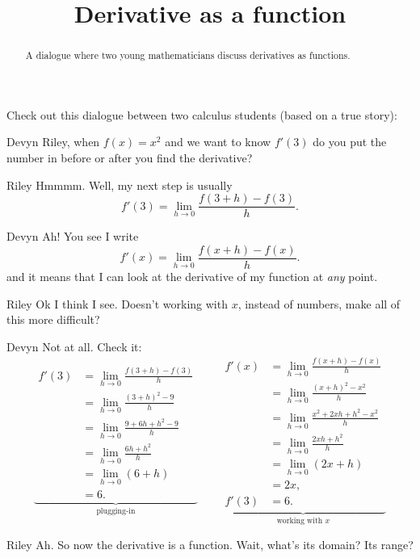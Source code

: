 \documentclass{ximera}
\title[Break-Ground:]{Derivative as a function}
\begin{document}
\begin{abstract}
A dialogue where two young mathematicians discuss derivatives as
functions.
\end{abstract}
\maketitle

Check out this dialogue between two calculus students (based on a true
story):

\begin{dialogue}
\item[Devyn] Riley, when $f(x) = x^2$ and we want to know $f'(3)$ do
  you put the number in before or after you find the derivative?
\item[Riley] Hmmmm. Well, my next step is usually
  \[
  f'(3) = \lim_{h\to 0}\frac{f(3+h)-f(3)}{h}.
  \]
\item[Devyn] Ah! You see I write
  \[
  f'(x) = \lim_{h\to 0}\frac{f(x+h)-f(x)}{h}.
  \]
  and it means that I can look at the derivative of my function at
  \textit{any} point.
\item[Riley] Ok I think I see. Doesn't working with $x$, instead of
  numbers, make all of this more difficult?
\item[Devyn] Not at all. Check it:
  \[
 \underbrace{\begin{aligned}
    f'(3) &= \lim_{h\to 0}\frac{f(3+h)-f(3)}{h}\\
    &= \lim_{h\to 0}\frac{(3+h)^2-9}{h}\\
    &= \lim_{h\to 0}\frac{9+6h+h^2-9}{h}\\
    &= \lim_{h\to 0}\frac{6h+h^2}{h}\\
    &= \lim_{h\to 0}(6+h)\\
    &= 6.
  \end{aligned}}_{\text{plugging-in}}
  \qquad
  \underbrace{\begin{aligned}
    f'(x) &= \lim_{h\to 0}\frac{f(x+h)-f(x)}{h}\\
    &= \lim_{h\to 0}\frac{(x+h)^2-x^2}{h}\\
    &= \lim_{h\to 0}\frac{x^2+2xh+h^2-x^2}{h}\\
    &= \lim_{h\to 0}\frac{2xh+h^2}{h}\\
    &= \lim_{h\to 0}(2x+h)\\
    &= 2x,\\
    f'(3) &=6. 
  \end{aligned}}_{\text{working with $x$}}
  \]
  \item[Riley] Ah. So now the derivative is a function. Wait, what's
    its domain? Its range?
\end{dialogue}
\end{document}
